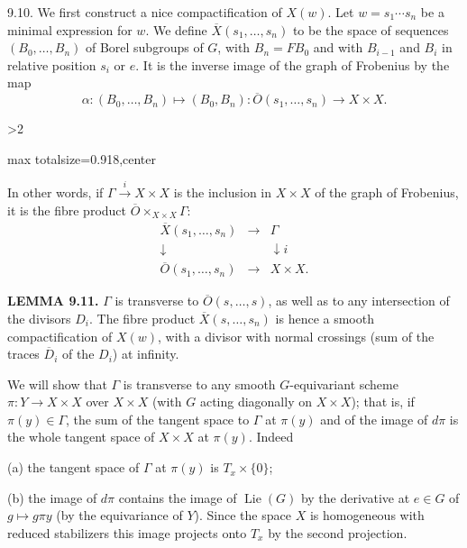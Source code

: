 \documentclass[9pt,twoside]{extarticle}
\newcommand{\EditionPage}[3]{%
  \ifnum#1>2\clearpage\fi
  \pdfbookmark[1]{Printed page #2}{en-folio-#2}%
  \hypertarget{en-physical-#1}{}%
  \noindent\begin{adjustbox}{max totalsize={\textwidth}{0.918\textheight},center}
  \begin{minipage}[t]{\textwidth}
  \fontsize{9.4}{11.1}\selectfont\justifying
  #3
  \end{minipage}
  \end{adjustbox}%
}
\begin{document}
{9.10. We first construct a nice compactification of \(X(w)\). Let \(w=s_1\cdots s_n\) be a minimal expression for \(w\). We define \(\overline X(s_1,\ldots,s_n)\) to be the space of sequences \((B_0,\ldots,B_n)\) of Borel subgroups of \(G\), with \(B_n=FB_0\) and with \(B_{i-1}\) and \(B_i\) in relative position \(s_i\) or \(e\). It is the inverse image of the graph of Frobenius by the map \[
\alpha:(B_0,\ldots,B_n)\longmapsto(B_0,B_n):
\overline O(s_1,\ldots,s_n)\longrightarrow X\times X.
\]\par
}

\EditionPage{50}{151}{%
In other words, if \(\Gamma\xrightarrow{i}X\times X\) is the inclusion in \(X\times X\) of the graph of Frobenius, it is the fibre product \(\overline O\times_{X\times X}\Gamma\): \[
\begin{array}{ccc}
\overline X(s_1,\ldots,s_n)&\longrightarrow&\Gamma\\
\downarrow&&\downarrow i\\
\overline O(s_1,\ldots,s_n)&\longrightarrow&X\times X.
\end{array}
\]\par

\noindent\textbf{LEMMA 9.11.} \(\Gamma\) is transverse to \(\overline O(s,\ldots,s)\), as well as to any intersection of the divisors \(D_i\). The fibre product \(\overline X(s,\ldots,s_n)\) is hence a smooth compactification of \(X(w)\), with a divisor with normal crossings (sum of the traces \(\overline D_i\) of the \(D_i\)) at infinity.\par

We will show that \(\Gamma\) is transverse to any smooth \(G\)-equivariant scheme \(\pi:Y\to X\times X\) over \(X\times X\) (with \(G\) acting diagonally on \(X\times X\)); that is, if \(\pi(y)\in\Gamma\), the sum of the tangent space to \(\Gamma\) at \(\pi(y)\) and of the image of \(d\pi\) is the whole tangent space of \(X\times X\) at \(\pi(y)\). Indeed\par

(a) the tangent space of \(\Gamma\) at \(\pi(y)\) is \(T_x\times\{0\}\);\par

(b) the image of \(d\pi\) contains the image of \(\operatorname{Lie}(G)\) by the derivative at \(e\in G\) of \(g\mapsto g\pi y\) (by the equivariance of \(Y\)). Since the space \(X\) is homogeneous with reduced stabilizers this image projects onto \(T_x\) by the second projection.\par

}
\end{document}
